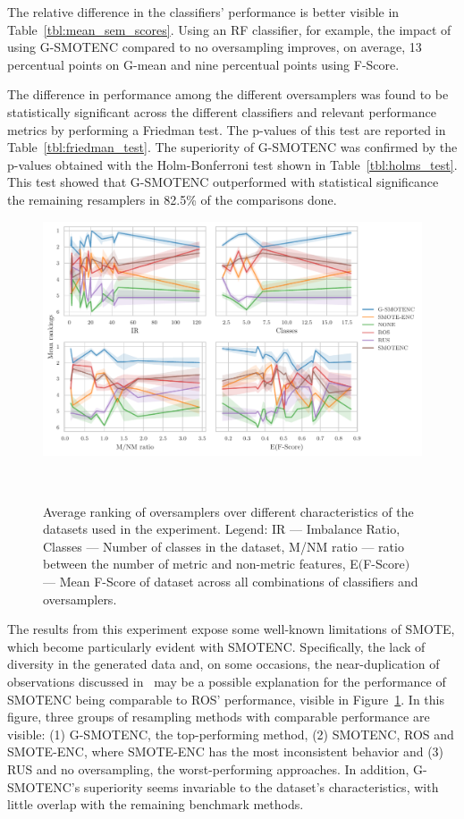 \documentclass[preprint,12pt]{elsarticle}
\begin{document}
{The relative difference in the classifiers' performance is better visible in
Table~\ref{tbl:mean_sem_scores}. Using an RF classifier, for example, the
impact of using G-SMOTENC compared to no oversampling improves, on average, 13
percentual points on G-mean and nine percentual points using F-Score. 

The difference in performance among the different oversamplers was found to be
statistically significant across the different classifiers and relevant
performance metrics by performing a Friedman test. The p-values of this test
are reported in Table~\ref{tbl:friedman_test}. The superiority of G-SMOTENC
was confirmed by the p-values obtained with the Holm-Bonferroni test shown in
Table~\ref{tbl:holms_test}. This test showed that G-SMOTENC outperformed with
statistical significance the remaining resamplers in 82.5\% of the comparisons
done.

\begin{figure}
	\centering
	\includegraphics[width=\linewidth]{../analysis/consistency_analysis_plot}
    \caption{Average ranking of oversamplers over different characteristics of
        the datasets used in the experiment. Legend: IR --- Imbalance Ratio,
        Classes --- Number of classes in the dataset, M/NM ratio --- ratio
        between the number of metric and non-metric features, E$($F-Score$)$
        --- Mean F-Score of dataset across all combinations of classifiers and
        oversamplers.
    }~\label{fig:consistency_analysis}
\end{figure}


The results from this experiment expose some well-known limitations of SMOTE,
which become particularly evident with SMOTENC. Specifically, the lack of
diversity in the generated data and, on some occasions, the near-duplication
of observations discussed in~\cite{douzas2019geometric} may be a possible
explanation for the performance of SMOTENC being comparable to ROS'
performance, visible in Figure~\ref{fig:consistency_analysis}. In this
figure, three groups of resampling methods with comparable performance are
visible: (1) G-SMOTENC, the top-performing method, (2) SMOTENC, ROS and
SMOTE-ENC, where SMOTE-ENC has the most inconsistent behavior and (3) RUS and
no oversampling, the worst-performing approaches. In addition, G-SMOTENC's
superiority seems invariable to the dataset's characteristics, with little
overlap with the remaining benchmark methods.

}
\end{document}
